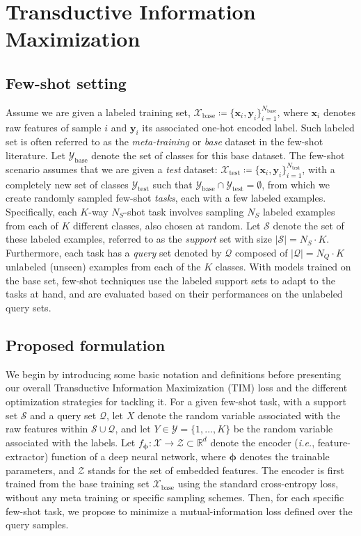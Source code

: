 \documentclass{article}
\newcommand{\base}{{\text{base}}}
\newcommand{\test}{{\text{test}}}
\newcommand{\x}{\bm{x}} \newcommand{\w}{\bm{w}} \newcommand{\p}{\bm{p}} \newcommand{\q}{\bm{q}} \newcommand{\cc}{\bm{c}} \newcommand{\y}{\bm{y}} \newcommand{\z}{\bm{z}} \newcommand{\Dcos}{D^{\text{cos}}}
\begin{document}
 
\section{Transductive Information Maximization}

\subsection{Few-shot setting}
    	Assume we are given a labeled training set, $\mathcal{X}_\base\coloneqq \{\x_i, \y_i\}_{i=1}^{N_\base}$, where 
    	$\x_i$ denotes raw features of sample $i$ and $\y_i$ its associated one-hot encoded label. Such labeled set is often referred to as the {\em meta-training} or {\em base} dataset in the few-shot literature. Let  
    	$\mathcal{Y}_\base$ denote the set of classes for this base dataset. The few-shot scenario assumes that we are given a {\em test} dataset: $\mathcal{X}_\test\coloneqq\{\x_i, \y_i\}_{i=1}^{N_\test}$, with a completely new set of classes $\mathcal{Y}_{\test}$ such that $\mathcal{Y}_\base \cap \mathcal{Y}_\test = \emptyset$, from which we create randomly sampled few-shot {\em tasks}, each with a few labeled examples. 
Specifically, each $K$-way $N_{S}$-shot task involves sampling $N_S$ labeled examples from each of $K$ different classes, also chosen at random.
    	Let $\mathcal{S}$ denote the set of these labeled examples, referred to as the \textit{support} set with size   $|\mathcal{S}|=N_{{S}}\cdot K$.
    	Furthermore, each task has a {\em query} set denoted by $\mathcal{Q}$ composed of $ | \mathcal{Q}| =N_{{Q}} \cdot K$ unlabeled (unseen) examples from each of the $K$ classes. With models trained on the base set, few-shot techniques use the labeled support sets to adapt to the tasks at hand, and are evaluated based on their performances on the unlabeled query sets.

	
	\subsection{Proposed formulation}\label{sec:formulation}
	

    	We begin by introducing some basic notation and definitions before presenting  our overall Transductive Information Maximization (TIM) loss and the different optimization strategies for tackling it. For a given few-shot task, with a support set $\mathcal{S}$ and a query set $\mathcal{Q}$, let $X$ denote the random variable associated with the raw features within ${\mathcal{S} \cup \mathcal{Q}}$, and let $Y \in  \mathcal{Y}=\{1, \dots, K \}$ be the random variable associated with the labels. Let $f_{\boldsymbol{\phi}}: \mathcal{X} \longrightarrow \mathcal{Z} \subset \mathbb{R}^d$ denote the encoder (\emph{i.e.}, feature-extractor) function of a deep neural network, where $\boldsymbol{\phi}$ denotes the trainable parameters, and $\mathcal{Z}$ stands for the set of embedded features. The encoder is first trained from the base training set $\mathcal{X}_\base$ using the standard cross-entropy loss, without any meta training or specific sampling schemes. Then, for each specific few-shot task, we propose to minimize a mutual-information loss defined over the query samples.
    	
\end{document}
